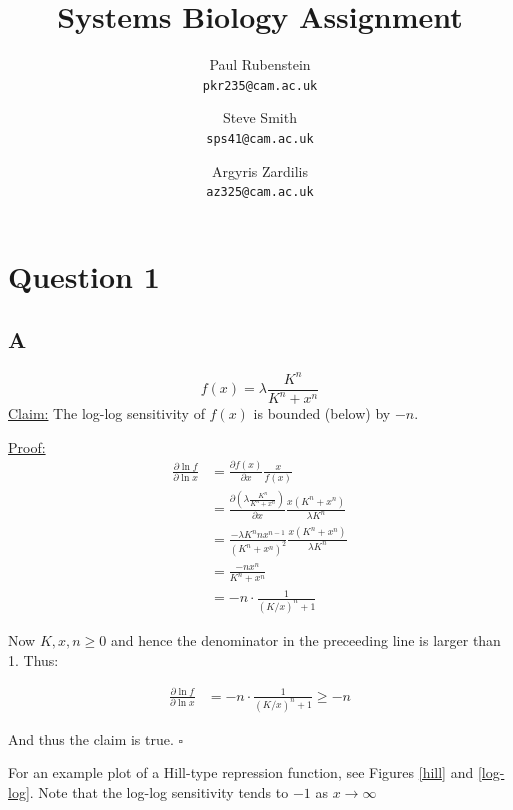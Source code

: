 \documentclass[a4paper,12pt]{article}
\author{Paul Rubenstein\\ \texttt{pkr235@cam.ac.uk} \and Steve Smith \\ \texttt{sps41@cam.ac.uk} \and Argyris Zardilis \\ \texttt{az325@cam.ac.uk}}
\title{Systems Biology Assignment}
\begin{document}
\maketitle

\section*{Question 1}
\subsection*{A}
\[f(x) = \lambda \frac{K^n}{K^n + x^n}\]
\underline{Claim:} The log-log sensitivity of $f(x)$ is bounded (below) by $-n$.

\noindent \underline{Proof:} 
\begin{align*}
\frac{\partial \ln f}{\partial \ln x} & =  \frac{\partial f(x)}{\partial x}\frac{x}{f(x)} \\
& = \frac{\partial (\lambda \frac{K^n}{K^n + x^n})}{\partial x} \frac{x(K^n + x^n)}{\lambda K^n} \\
& = \frac{- \lambda K^n n x^{n-1}}{(K^n + x^n)^2} \frac{x(K^n + x^n)}{\lambda K^n} \\
& = \frac{-n x^n}{K^n + x^n}\\
& = -n \cdot \frac{1}{(K/x)^n+1}
\end{align*}

Now $K, x, n \geq 0$ and hence the denominator in the preceeding line is larger than 1. Thus:

\begin{align*}
\frac{\partial \ln f}{\partial \ln x} & = -n \cdot \frac{1}{(K/x)^n+1} \geq -n
\end{align*}

And thus the claim is true. $\square$

For an example plot of a Hill-type repression function, see Figures \ref{hill} and \ref{log-log}. Note that the log-log sensitivity tends to $-1$ as $x\longrightarrow \infty$
\end{document}
